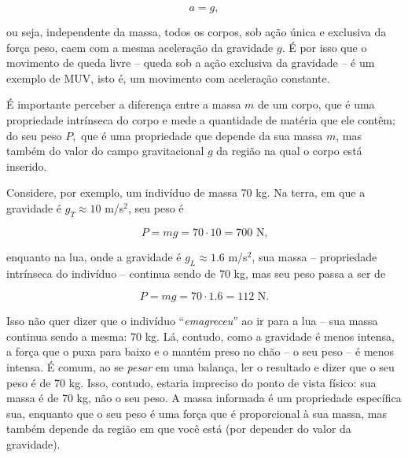 $$  \boxed{  a = g,} $$

\noindent ou seja, independente da massa, todos os corpos, sob ação única e exclusiva da força peso, caem com a mesma aceleração da gravidade $g.$ É por isso que o movimento de queda livre -- queda sob a ação exclusiva da gravidade -- é um exemplo de MUV, isto é, um movimento com aceleração constante.


É importante perceber a diferença entre a massa $m$ de um corpo, que é uma propriedade intrínseca do corpo e mede a quantidade de matéria que ele contêm; do seu peso $P,$ que é uma propriedade que depende da sua massa $m$, mas também do valor do campo gravitacional $g$ da região na qual o corpo está inserido.

Considere, por exemplo, um indivíduo de massa $70$ kg. Na terra, em que a gravidade é $g_T \approx 10$ m/s$^2$, seu peso é

$$ P = mg = 70 \cdot 10 = 700 \text{ N,}$$

\noindent enquanto na lua, onde a gravidade é $g_L \approx 1.6$ m/s$^2$, sua massa -- propriedade intrínseca do indivíduo -- continua sendo de 70 kg, mas seu peso passa a ser de

$$ P = mg = 70 \cdot 1.6 = 112 \text{ N.}$$

Isso não quer dizer que o indivíduo ``\textit{emagreceu}'' ao ir para a lua -- sua massa continua sendo a mesma: 70 kg. Lá, contudo, como a gravidade é menos intensa, a força que o puxa para baixo e o mantém preso no chão -- o seu peso -- é menos intensa. É comum, ao se \textit{pesar} em uma balança, ler o resultado e dizer que o seu peso é de 70 kg. Isso, contudo, estaria impreciso do ponto de vista físico: sua massa é de 70 kg, não o seu peso. A massa informada é um propriedade específica sua, enquanto que o seu peso é uma força que é proporcional à sua massa, mas também depende da região em que você está (por depender do valor da gravidade).


\vspace{0.3cm}

